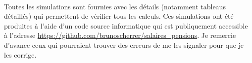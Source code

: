 \documentclass[a4paper,10pt]{report}
\begin{document}
~\\

{\small
Toutes les simulations sont fournies avec les détails (notamment tableaus détaillés) qui permettent de vérifier tous les calculs. Ces simulations ont été produites à l'aide d'un code source informatique qui est publiquement accessible à l'adresse \url{https://github.com/brunoscherrer/salaires_pensions}. Je remercie d'avance ceux qui pourraient trouver des erreurs de me les signaler pour que je les corrige. 
}

\newpage

{\small
\setcounter{tocdepth}{0}
\begingroup
\let\clearpage\relax
\tableofcontents
\endgroup
}


\end{document}
